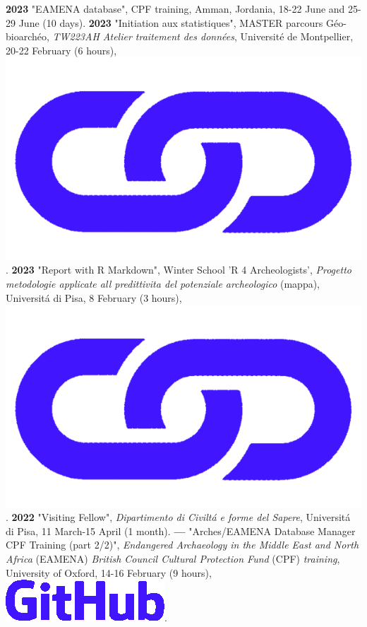 \documentclass{article}
\begin{document}
\textbf{2023 }"EAMENA database", CPF training, Amman, Jordania,  18-22 June and 25-29 June (10 days).
\smallbreak
\textbf{2023 }"Initiation aux statistiques", MASTER parcours Géo-bioarchéo, \textit{TW223AH Atelier traitement des données}, Universit\'{e} de Montpellier, 20-22 February (6 hours), \href{http://shinyserver.cfs.unipi.it:3838/teach/stats/upv/_site/#/title-slide}{\includegraphics[scale=0.02]{link_darkblue.png}}.
\smallbreak
\textbf{2023 }"Report with R Markdown", Winter School 'R 4 Archeologists', \textit{Progetto metodologie applicate all predittivita del potenziale archeologico} (mappa), Universit\'{a} di Pisa, 8 February (3 hours), \href{https://zoometh.github.io/thomashuet/teach/stats/r4a}{\includegraphics[scale=0.02]{link_darkblue.png}}.
\smallbreak
\textbf{2022 }"Visiting Fellow", \textit{Dipartimento di Civilt\'{a} e forme del Sapere}, Universit\'{a} di Pisa, 11 March-15 April (1 month).
\smallbreak
\textbf{--- }"Arches/EAMENA Database Manager CPF Training (part 2/2)", \textit{Endangered Archaeology in the Middle East and North Africa} (EAMENA) \textit{British Council Cultural Protection Fund} (CPF) \textit{training}, University of Oxford, 14-16 February (9 hours), \href{https://github.com/eamena-oxford/eamena-arches-dev/tree/main/training#readme}{\includegraphics[scale=0.12]{github-rect.png}}.
\end{document}
